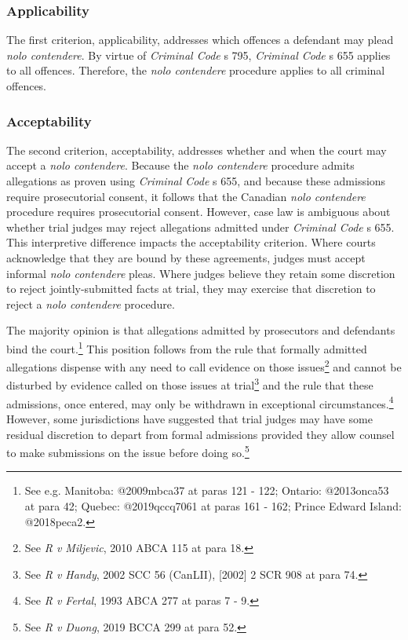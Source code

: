 \subsubsection{Applicability}

The first criterion, applicability, addresses which offences a defendant may plead \textit{nolo contendere}. By virtue of \textit{Criminal Code} s 795, \textit{Criminal Code} s 655 applies to all offences. Therefore, the \textit{nolo contendere} procedure applies to all criminal offences.

\subsubsection{Acceptability}

The second criterion, acceptability, addresses whether and when the court may accept a \textit{nolo contendere}. Because the \textit{nolo contendere} procedure admits allegations as proven using \textit{Criminal Code} s 655, and because these admissions require prosecutorial consent, it follows that the Canadian \textit{nolo contendere} procedure requires prosecutorial consent. However, case law is ambiguous about whether trial judges may reject allegations admitted under \textit{Criminal Code} s 655. This interpretive difference impacts the acceptability criterion. Where courts acknowledge that they are bound by these agreements, judges must accept informal \textit{nolo contendere} pleas. Where judges believe they retain some discretion to reject jointly-submitted facts at trial, they may exercise that discretion to reject a \textit{nolo contendere} procedure.

The majority opinion is that allegations admitted by prosecutors and defendants bind the court.\footnote{See e.g. Manitoba: @2009mbca37 at paras 121 - 122; Ontario:  @2013onca53 at para 42; Quebec: @2019qccq7061 at paras 161 - 162; Prince Edward Island: @2018peca2.} This position follows from the rule that formally admitted allegations dispense with any need to call evidence on those issues\footnote{See \textit{R v Miljevic}, 2010 ABCA 115 at para 18.} and cannot be disturbed by evidence called on those issues at trial\footnote{See \textit{R v Handy}, 2002 SCC 56 (CanLII), [2002] 2 SCR 908 at para 74.} and the rule that these admissions, once entered, may only be withdrawn in exceptional circumstances.\footnote{See \textit{R v Fertal}, 1993 ABCA 277 at paras 7 - 9.} However, some jurisdictions have suggested that trial judges may have some residual discretion to depart from formal admissions provided they allow counsel to make submissions on the issue before doing so.\footnote{See \textit{R v Duong}, 2019 BCCA 299 at para 52.}

